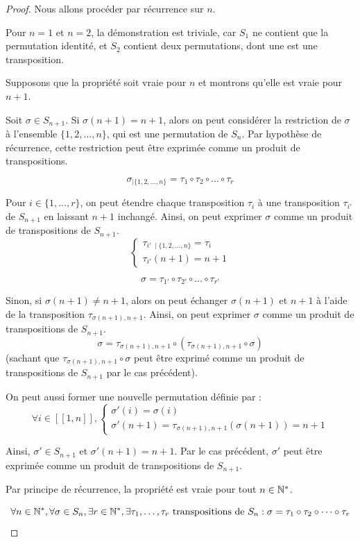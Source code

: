 \documentclass[12pt, a4paper]{report}
\begin{document}
\begin{proof}
    Nous allons procéder par récurrence sur $n$.

    Pour $n=1$ et $n=2$, la démonstration est triviale, car $S_1$ ne contient que la permutation identité, et $S_2$ contient deux permutations, dont une est une transposition.

    Supposons que la propriété soit vraie pour $n$ et montrons qu'elle est vraie pour $n+1$.

    Soit $\sigma \in S_{n+1}$. Si $\sigma(n+1) = n+1$, alors on peut considérer la restriction de $\sigma$ à l'ensemble $\{1, 2, \dots, n\}$, qui est une permutation de $S_n$. Par hypothèse de récurrence, cette restriction peut être exprimée comme un produit de transpositions.
    
    $$\sigma_{\mid \{1, 2, \dots, n\}} = \tau_1 \circ \tau_2 \circ \dots \circ \tau_r$$

    Pour $i \in \{1, \dots, r\}$, on peut étendre chaque transposition
    $\tau_i$ à une transposition $\tau_{i'}$ de $S_{n+1}$ en laissant $n+1$ inchangé. Ainsi, on peut exprimer $\sigma$ comme un produit de transpositions de $S_{n+1}$.
    $$\begin{cases} 
        \tau_{i'~\mid \{1, 2, \dots, n\}} = \tau_i \\
        \tau_{i'}(n+1) = n+1
    \end{cases}$$

    $$\sigma = \tau_{1'} \circ \tau_{2'} \circ \dots \circ \tau_{r'}$$

    Sinon, si $\sigma(n+1) \ne n+1$, alors on peut échanger $\sigma(n+1)$ et $n+1$ à l'aide de la transposition $\tau_{\sigma(n+1),n+1}$. Ainsi, on peut exprimer $\sigma$ comme un produit de transpositions de $S_{n+1}$.
    $$\sigma = \tau_{\sigma(n+1),n+1} \circ (\tau_{\sigma(n+1),n+1} \circ \sigma)$$
    (sachant que $\tau_{\sigma(n+1),n+1} \circ \sigma$ peut être exprimé comme un produit de transpositions de $S_{n+1}$ par le cas précédent).

    On peut aussi former une nouvelle permutation définie par :
    $$\forall i \in [\![1,n]\!], \begin{cases}
        \sigma'(i) = \sigma(i) \\
        \sigma'(n+1) = \tau_{\sigma(n+1),n+1}(\sigma(n+1)) = n+1
    \end{cases}$$

    Ainsi, $\sigma' \in S_{n+1}$ et $\sigma'(n+1) = n+1$. Par le cas précédent, $\sigma'$ peut être exprimée comme un produit de transpositions de $S_{n+1}$.

    Par principe de récurrence, la propriété est vraie pour tout $n \in \mathbb{N}^*$.

    $$\forall n \in \mathbb{N}^*, \forall \sigma \in S_n, \exists r \in \mathbb{N}^*, \exists \tau_1, \dots, \tau_r \text{ transpositions de } S_n : \sigma = \tau_1 \circ \tau_2 \circ \dots \circ \tau_r$$
\end{proof}
\end{document}

